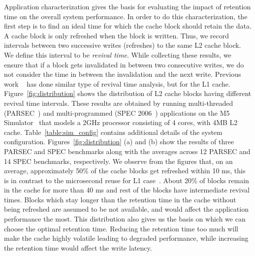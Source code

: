 Application characterization gives the basis for evaluating the impact of retention time on the overall system performance. In order to do this characterization, the first step is to  find an ideal time for which the cache block should retain the data.  A cache block is only refreshed when the block is written. Thus, we record intervals between two successive writes (refreshes) to the same L2 cache block. We define this interval to be {\it revival time}.
While collecting these results, we ensure that if a block gets invalidated in between two consecutive writes,
we do not consider the time in between the invalidation and the next write.
Previous work ~\cite{brooks} has done similar type of revival time analysis, but for the L1 cache. Figure~\ref{fig:distribution} shows the distribution of L2 cache blocks having different revival time intervals. These results are obtained by running multi-threaded (PARSEC~\cite{PARSEC}) and multi-programmed (SPEC 2006~\cite{SPEC}) applications on the M5 Simulator~\cite{M5} that models a 2GHz processor consisting of 4 cores, with 4MB L2 cache. Table~\ref{table:sim_config} contains additional details of the system configuration.
Figures~\ref{fig:distribution} (a) and (b) show the results of three PARSEC and SPEC benchmarks along with the averages
across 12 PARSEC  and 14 SPEC benchmarks, respectively. We observe from the figures that, on an average,
approximately 50\% of the cache blocks get refreshed within 10 ms, this is in contrast to the microsecond
reuse for L1 case~\cite{brooks}. About 20\% of blocks remain in the cache for more than 40 ms and rest of the blocks
have intermediate revival times. Blocks which stay longer than the retention time in the cache without being refreshed
are assumed to be not available, and would affect the application performance the most.
This distribution also gives us the basis on which we can choose the optimal retention time.
Reducing the retention time too much will make the cache highly volatile leading to degraded performance,
while increasing the retention time would affect the write latency.



